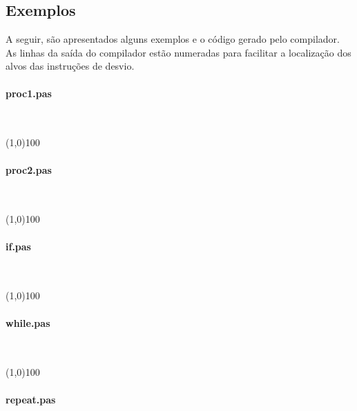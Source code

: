 \subsection{Exemplos}
A seguir, são apresentados alguns exemplos e o código gerado pelo compilador.
As linhas da saída do compilador estão numeradas para facilitar a localização
dos alvos das instruções de desvio.
\begin{multicols}{2}
\paragraph{proc1.pas}~
\scriptsize


\normalsize

\line(1,0){100}
\paragraph{proc2.pas}~
\scriptsize


\normalsize

\line(1,0){100}
\paragraph{if.pas}~
\scriptsize


\normalsize

\line(1,0){100}
\paragraph{while.pas}~
\scriptsize


\normalsize

\line(1,0){100}
\paragraph{repeat.pas}~
\scriptsize


\normalsize

\end{multicols}
